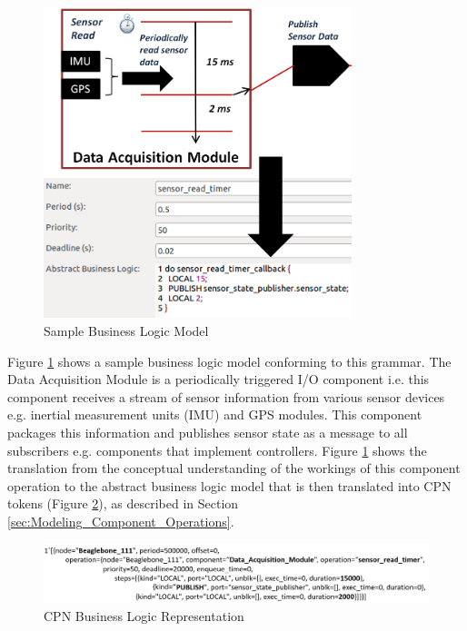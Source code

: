 \begin{figure}[ht]
	\centering
	\includegraphics[width=0.8\textwidth]{./img/abstract_business_logic}
	\caption{Sample Business Logic Model}
	\label{fig:sblm}
\end{figure}

Figure \ref{fig:sblm} shows a sample business logic model conforming to this grammar. The Data Acquisition Module is a periodically triggered I/O component i.e. this component receives a stream of sensor information from various sensor devices e.g. inertial measurement units (IMU) and GPS modules. This component packages this information and publishes sensor state as a message to all subscribers e.g. components that implement controllers. Figure \ref{fig:sblm} shows the translation from the conceptual understanding of the workings of this component operation to the abstract business logic model that is then translated into CPN tokens (Figure \ref{fig:blte}), as described in Section \ref{sec:Modeling_Component_Operations}. 

\begin{figure}[ht]
	\centering
	\includegraphics[width=\textwidth]{./img/cpn_business_logic_token_example}
	\caption{CPN Business Logic Representation}
	\label{fig:blte}
\end{figure}

